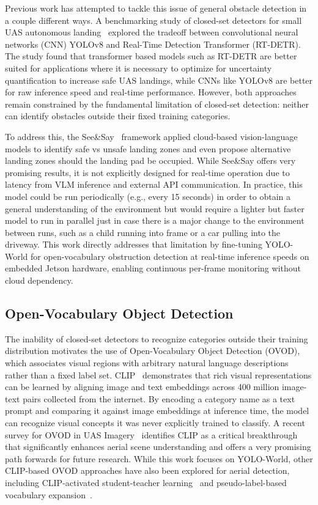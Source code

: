 \documentclass[conf]{new-aiaa}
\begin{document}
Previous work has attempted to tackle this issue of general obstacle detection in a couple different ways. A benchmarking study of closed-set detectors for small UAS autonomous landing~\cite{vu2025transformer} explored the tradeoff between convolutional neural networks (CNN) YOLOv8 and Real-Time Detection Transformer (RT-DETR). The study found that transformer based models such as RT-DETR are better suited for applications where it is necessary to optimize for uncertainty quantification to increase safe UAS landings, while CNNs like YOLOv8 are better for raw inference speed and real-time performance. However, both approaches remain constrained by the fundamental limitation of closed-set detection: neither can identify obstacles outside their fixed training categories.

To address this, the See\&Say~\cite{ghazanfari2026seesay} framework applied cloud-based vision-language models to identify safe vs unsafe landing zones and even propose alternative landing zones should the landing pad be occupied. While See\&Say offers very promising results, it is not explicitly designed for real-time operation due to latency from VLM inference and external API communication. In practice, this model could be run periodically (e.g., every 15 seconds) in order to obtain a general understanding of the environment but would require a lighter but faster model to run in parallel just in case there is a major change to the environment between runs, such as a child running into frame or a car pulling into the driveway. This work directly addresses that limitation by fine-tuning YOLO-World for open-vocabulary obstruction detection at real-time inference speeds on embedded Jetson hardware, enabling continuous per-frame monitoring without cloud dependency.


\subsection{Open-Vocabulary Object Detection}

The inability of closed-set detectors to recognize categories
outside their training distribution motivates the use of
Open-Vocabulary Object Detection (OVOD), which associates visual
regions with arbitrary natural language descriptions rather
than a fixed label set. CLIP~\cite{radford2021learning}
demonstrates that rich visual representations can be learned
by aligning image and text embeddings across 400 million
image-text pairs collected from the internet. By encoding a
category name as a text prompt and comparing it against image
embeddings at inference time, the model can recognize visual
concepts it was never explicitly trained to classify. A recent survey for OVOD in UAS Imagery~\cite{zhou2025ovuavsurvey} identifies {CLIP} as a critical breakthrough that significantly enhances aerial scene understanding and offers a very promising path forwards for future research. While this work focuses on {YOLO-World}, other {CLIP}-based {OVOD} approaches have also been explored
for aerial detection, including {CLIP}-activated student-teacher learning~\cite{li2024clipaerial} and pseudo-label-based vocabulary expansion~\cite{li2024castdet}.
\end{document}
